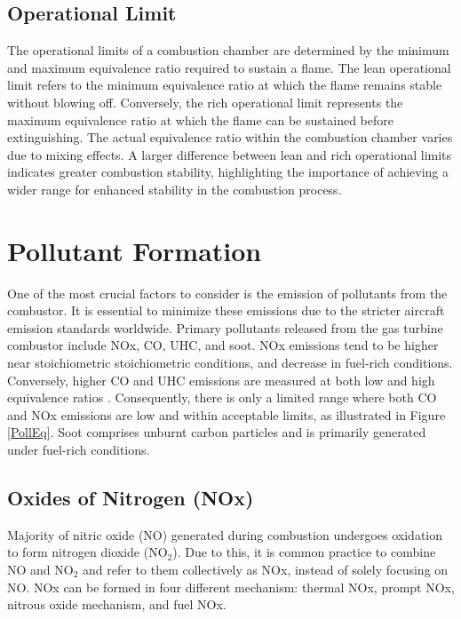 \subsection{Operational Limit}
The operational limits of a combustion chamber are determined by the minimum and maximum equivalence ratio required to sustain a flame. The lean operational limit refers to the minimum equivalence ratio at which the flame remains stable without blowing off. Conversely, the rich operational limit represents the maximum equivalence ratio at which the flame can be sustained before extinguishing. The actual equivalence ratio within the combustion chamber varies due to mixing effects. A larger difference between lean and rich operational limits indicates greater combustion stability, highlighting the importance of achieving a wider range for enhanced stability in the combustion process.

\section{Pollutant Formation}
One of the most crucial factors to consider is the emission of pollutants from the combustor. It is essential to minimize these emissions due to the stricter aircraft emission standards worldwide. Primary pollutants released from the gas turbine combustor include NOx, CO, UHC, and soot. NOx emissions tend to be higher near stoichiometric stoichiometric conditions, and decrease in fuel-rich conditions. Conversely, higher CO and UHC emissions are measured at both low and high equivalence ratios \cite{VAThesis2011}. Consequently, there is only a limited range where both CO and NOx emissions are low and within acceptable limits, as illustrated in Figure \ref{PollEq}. Soot comprises unburnt carbon particles and is primarily generated under fuel-rich conditions.

\subsection{Oxides of Nitrogen (NOx)}
Majority of nitric oxide (NO) generated during combustion undergoes oxidation to form nitrogen dioxide (NO$_2$). Due to this, it is common practice to combine NO and NO$_2$ and refer to them collectively as NOx, instead of solely focusing on NO. NOx can be formed in four different mechanism: thermal NOx, prompt NOx, nitrous oxide mechanism, and fuel NOx.


